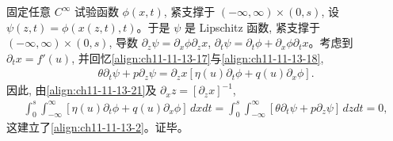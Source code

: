 \documentclass[../../main.tex]{subfiles}
\begin{document}
固定任意 $C^\infty$ 试验函数 $\phi(x,t)$, 紧支撑于 $(-\infty,\infty)\times(0,s)$, 设 $\psi(z,t)=\phi(x(z,t),t)$。于是 $\psi$ 是 Lipschitz 函数, 紧支撑于 $(-\infty,\infty)\times(0,s)$, 导数 $\partial_z\psi=\partial_x\phi\partial_z x$, $\partial_t\psi=\partial_t\phi+\partial_x\phi\partial_t x$。考虑到 $\partial_t x=f'(u)$, 并回忆\eqref{align:ch11-11-13-17}与\eqref{align:ch11-11-13-18},
\begin{align}
\theta\partial_t\psi+p\partial_z\psi=\partial_z x[\eta(u)\partial_t\phi+q(u)\partial_x\phi].\label{align:ch11-11-13-22}
\end{align}
因此, 由\eqref{align:ch11-11-13-21}及 $\partial_x z=[\partial_z x]^{-1}$,
\begin{align}
\int_0^s\int_{-\infty}^\infty[\eta(u)\partial_t\phi+q(u)\partial_x\phi]\,dxdt
=\int_0^s\int_{-\infty}^\infty[\theta\partial_t\psi+p\partial_z\psi]\,dzdt=0,\label{align:ch11-11-13-23}
\end{align}
这建立了\eqref{align:ch11-11-13-2}。证毕。
\end{document}
